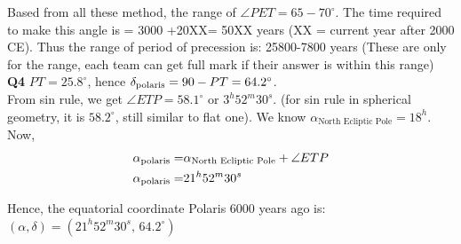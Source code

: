 \documentclass[a4paper,12pt]{extarticle}
\begin{document}
\begin{sol}
Based from all these method, the range of $\angle PET= 65 -70^\circ$.
The time required to make this angle is = 3000 +20XX= 50XX years (XX = current year after 2000 CE). Thus the range of period of precession is: 25800-7800 years (These are only for the range, each team can get full mark if their answer is within this range)\\

\textbf{Q4}  $PT=25.8^\circ$, hence $\delta_{\rm polaris} = 90-PT =64.2^\circ$.\\

From sin rule, we get $\angle ETP = 58.1^\circ$ or $3^h52^m30^s$. (for sin rule in spherical geometry, it is $58.2^\circ$, still similar to flat one). We know $\alpha_{\text{North Ecliptic Pole}}=18^h$. Now, 
\begin{align*}
	\alpha_{\rm polaris}=& \alpha_{\text{North Ecliptic Pole}}+ \angle ETP\\
	\alpha_{\rm polaris}=& 21^h52^m30^s
\end{align*}

Hence, the equatorial coordinate Polaris 6000 years ago is: $(\alpha, \delta)= (21^h 52^m 30^s,\, 64.2^\circ)$
\end{sol}

\clearpage 
\end{document}
